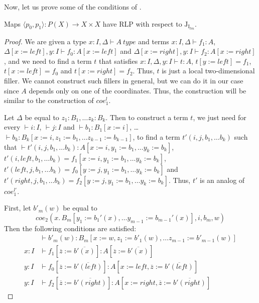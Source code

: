 \documentclass[reqno]{amsart}
\theoremstyle{definition}
\theoremstyle{remark}
\newcommand{\repl}{:=}
\newcommand{\I}{\mathrm{I}}
\newcommand{\J}{\mathrm{J}}
\numberwithin{figure}{section}
\begin{document}
Now, let us prove some of the conditions of .
\begin{lem}[Jtm]
Maps $\langle p_0, p_1 \rangle : P(X) \to X \times X$ have RLP with respect to $\J_{\I_{tm}}$.
\end{lem}
\begin{proof}
We are given a type $x : I, \Delta \vdash A\ type$ and terms $x : I, \Delta \vdash f_1 : A$, $\Delta[x \repl left], y : I \vdash f_0 : A[x \repl left]$ and $\Delta[x \repl right], y : I \vdash f_2 : A[x \repl right]$,
and we need to find a term $t$ that satisfies $x : I, \Delta, y : I \vdash t : A$, $t[y \repl left] = f_1$, $t[x \repl left] = f_0$ and $t[x \repl right] = f_2$.
Thus, $t$ is just a local two-dimensional filler.
We cannot construct such fillers in general, but we can do it in our case since $A$ depends only on one of the coordinates.
Thus, the construction will be similar to the construction of $coe^l_1$.

Let $\Delta$ be equal to $z_1 : B_1, \ldots z_k : B_k$.
Then to construct a term $t$, we just need for every $\vdash i : I$, $\vdash j : I$ and $\vdash b_1 : B_1[x \repl i]$, \ldots $\vdash b_k : B_k[x \repl i, z_1 \repl b_1, \ldots z_{k-1} \repl b_{k-1}]$,
to find a term $t'(i, j, b_1, \ldots b_k)$ such that $\vdash t'(i, j, b_1, \ldots b_k) : A[x \repl i, y_1 \repl b_1, \ldots y_k \repl b_k]$, $t'(i, left, b_1, \ldots b_k) = f_1[x \repl i, y_1 \repl b_1, \ldots y_k \repl b_k]$,
$t'(left, j, b_1, \ldots b_k) = f_0[y \repl j, y_1 \repl b_1, \ldots y_k \repl b_k]$ and $t'(right, j, b_1, \ldots b_k) = f_2[y \repl j, y_1 \repl b_1, \ldots y_k \repl b_k]$.
Thus, $t'$ is an analog of $coe^{l'}_1$.

First, let $b'_m(w)$ be equal to
\[ coe_2(x.\,B_m[y_1 \repl b_1'(x), \ldots y_{m-1} \repl b_{m-1}'(x)], i, b_m, w) \]
Then the following conditions are satisfied:
\begin{align*}
& \vdash b'_m(w) : B_m[x \repl w, z_1 \repl b'_1(w), \ldots z_{m-1} \repl b'_{m-1}(w)] \\
x : I & \vdash f_1[\overline{z} \repl \overline{b'(x)}] : A[\overline{z} \repl \overline{b'(x)}] \\
y : I & \vdash f_0[\overline{z} \repl \overline{b'(left)}] : A[x \repl left, \overline{z} \repl \overline{b'(left)}] \\
y : I & \vdash f_2[\overline{z} \repl \overline{b'(right)}] : A[x \repl right, \overline{z} \repl \overline{b'(right)}]
\end{align*}
\end{proof}
\end{document}
